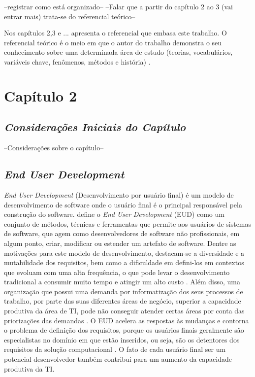 --registrar como está organizado--
--Falar que a partir do capítulo 2 ao 3 (vai entrar mais) trata-se do referencial teórico--

Nos capítulos 2,3 e ... apresenta o referencial que embasa este trabalho. O referencial teórico é o meio em que o autor do trabalho demonstra o seu conhecimento sobre uma determinada área de estudo (teorias, vocabulários, variáveis chave, fenômenos, métodos e história) \cite{randolph2009}.


\chapter[Capítulo 2]{Capítulo 2}

\section{\textit{Considerações Iniciais do Capítulo}}

--Considerações sobre o capítulo--

\section{\textit{End User Development}}

\textit{End User Development} (Desenvolvimento por usuário final) é um modelo de desenvolvimento de software onde o usuário final é o principal responsável pela construção do software.  define o \textit{End User Development} (EUD) como um conjunto de métodos, técnicas e ferramentas que permite aos usuários de sistemas de software, que agem como desenvolvedores de software não profissionais, em algum ponto, criar, modificar ou estender um artefato de software. Dentre as motivações para este modelo de desenvolvimento, destacam-se a diversidade e a mutabilidade dos requisitos, bem como a dificuldade em defini-los em contextos que evoluam com uma alta frequência, o que pode levar o desenvolvimento tradicional a consumir muito tempo e atingir um alto custo \cite{lieberman2006}. Além disso, uma organização que possui uma demanda por informatização dos seus processos de trabalho, por parte das suas diferentes áreas de negócio, superior a capacidade produtiva da área de TI, pode não conseguir atender certas áreas por conta das priorizações das demandas \cite{artigoTcuGovTI}. O EUD acelera as respostas às mudanças e contorna o problema de definição dos requisitos, porque os usuários finais geralmente são especialistas no domínio em que estão inseridos, ou seja, são os detentores dos requisitos da solução computacional \cite{fischer2004}. O fato de cada usuário final ser um potencial desenvolvedor também contribui para um aumento da capacidade produtiva da TI.

